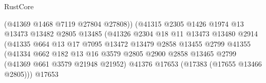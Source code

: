 \begin{lexlean}{RustCore}
\begin{coremodule}
                                                (@41369 @1468 @7119 @27804 @27808))
                                              (@41315
                                                @2305
                                                @1426
                                                @1974
                                                @13
                                                @13473
                                                @13482
                                                @2805
                                                @13485
                                                (@41326
                                                  @2304
                                                  @18
                                                  @11
                                                  @13473
                                                  @13480
                                                  @2914
                                                  (@41335
                                                    @664
                                                    @13
                                                    @17
                                                    @7095
                                                    @13472
                                                    @13479
                                                    @2858
                                                    @13455
                                                    @2799
                                                    @41355
                                                    (@41334
                                                      @662
                                                      @182
                                                      @13
                                                      @16
                                                      @3579
                                                      @2805
                                                      @2900
                                                      @2858
                                                      @13465
                                                      @2799
                                                      (@41369 @661 @3579 @21948 @21952)
                                                      @41376
                                                      @17653
                                                      (@17383 (@17655 @13466 @2805)))
                                                    @17653

\end{coremodule}
\end{lexlean}
